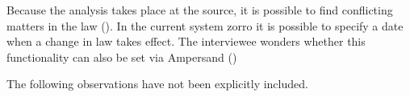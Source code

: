 Because the analysis takes place at the source, it is possible to find conflicting matters in the law ().
In the current system \acrshort{zorro} it is possible to specify a date when a change in law takes effect.
The interviewee wonders whether this functionality can also be set via Ampersand ()

The following observations have not been explicitly included.
